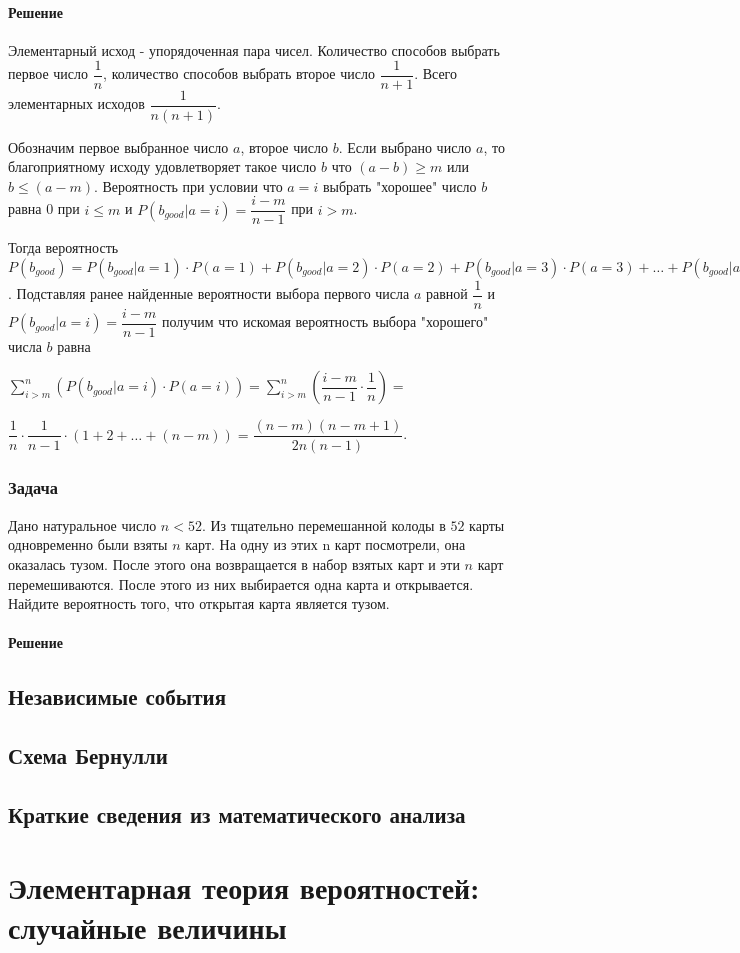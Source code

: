 \documentclass[a4paper,12pt]{article}
\begin{document}
\paragraph{Решение}
Элементарный исход - упорядоченная пара чисел. Количество способов выбрать первое число \( \dfrac{1}{n} \), количество способов выбрать второе число \( \dfrac{1}{n+1} \). Всего элементарных исходов \( \dfrac{1}{n(n+1)} \).

Обозначим первое выбранное число \(a\), второе число \(b\). Если выбрано число \(a\), то благоприятному исходу удовлетворяет такое число \(b\) что \( (a-b) \geqslant m\) или \( b \leqslant (a - m) \). Вероятность при условии что \(a=i\) выбрать "хорошее" число \(b\) равна 0 при \(i \leqslant m\) и \( P(b_{good}|a=i) = \dfrac{i-m}{n-1} \) при \( i > m \).

Тогда вероятность \( P(b_{good}) = P(b_{good}|a=1) \cdot P(a=1) + P(b_{good}|a=2) \cdot P(a=2) + P(b_{good}|a=3) \cdot P(a=3) + \ldots + P(b_{good}|a=n) \cdot P(a=n) = \sum_{i > m}^{n} \left( P(b_{good}|a=i) \cdot P(a=i) \right) \). Подставляя ранее найденные вероятности выбора первого числа \(a\) равной \(\dfrac{1}{n}\) и \( P(b_{good}|a=i) = \dfrac{i-m}{n-1} \) получим что искомая вероятность выбора "хорошего" числа \(b\) равна 

\( \sum_{i > m}^{n} \left( P(b_{good}|a=i) \cdot P(a=i) \right) =
 \sum_{i > m}^{n} \left( \dfrac{i-m}{n-1} \cdot \dfrac{1}{n} \right) = \) 

\(\dfrac{1}{n} \cdot \dfrac{1}{n-1} \cdot \left( 1+2+\ldots + (n-m) \right) = \dfrac{(n-m)(n-m+1)}{2n(n-1)} \).


\subsubsection*{Задача}
Дано натуральное число \(n<52\). Из тщательно перемешанной колоды в \(52\) карты одновременно были взяты \(n\) карт. На одну из этих n карт посмотрели, она оказалась тузом. После этого она возвращается в набор взятых карт и эти \(n\) карт перемешиваются. После этого из них выбирается одна карта и открывается. Найдите вероятность того, что открытая карта является тузом.
\paragraph{Решение}


\subsection{Независимые события}
\subsection{Схема Бернулли}
\subsection{Краткие сведения из математического анализа}


\section{Элементарная теория вероятностей: случайные величины}
\end{document}

